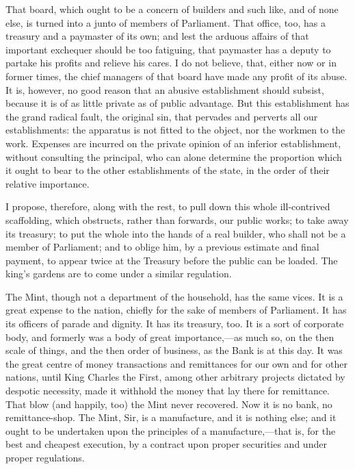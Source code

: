 That board, which ought to be a concern of builders and such like, and of none else, is turned into a junto of members of Parliament. That office, too, has a treasury and a paymaster of its own; and lest the arduous affairs of that important exchequer should be too fatiguing, that paymaster has a deputy to partake his profits and relieve his cares. I do not believe, that, either now or in former times, the chief managers of that board have made any profit of its abuse. It is, however, no good reason that an abusive establishment should subsist, because it is of as little private as of public advantage. But this establishment has the grand radical fault, the original sin, that pervades and perverts all our establishments: the apparatus is not fitted to the object, nor the workmen to the work. Expenses are incurred on the private opinion of an inferior establishment, without consulting the principal, who can alone determine the proportion which it ought to bear to the other establishments of the state, in the order of their relative importance.

I propose, therefore, along with the rest, to pull down this whole ill-contrived scaffolding, which obstructs, rather than forwards, our public works; to take away its treasury; to put the whole into the hands of a real builder, who shall not be a member of Parliament; and to oblige him, by a previous estimate and final payment, to appear twice at the Treasury before the public can be loaded. The king's gardens are to come under a similar regulation.

The Mint, though not a department of the household, has the same vices. It is a great expense to the nation, chiefly for the sake of members of Parliament. It has its officers of parade and dignity. It has its treasury, too. It is a sort of corporate body, and formerly was a body of great importance,—as much so, on the then scale of things, and the then order of business, as the Bank is at this day. It was the great centre of money transactions and remittances for our own and for other nations, until King Charles the First, among other arbitrary projects dictated by despotic necessity, made it withhold the money that lay there for remittance. That blow (and happily, too) the Mint never recovered. Now it is no bank, no remittance-shop. The Mint, Sir, is a manufacture, and it is nothing else; and it ought to be undertaken upon the principles of a manufacture,—that is, for the best and cheapest execution, by a contract upon proper securities and under proper regulations.

